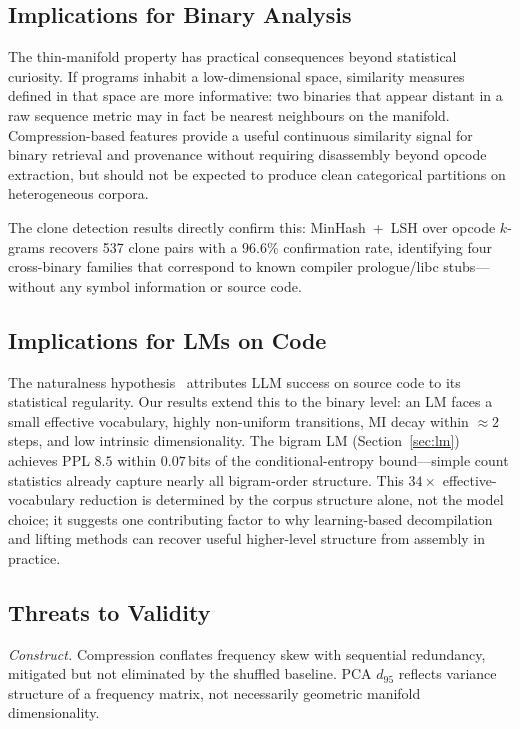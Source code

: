 \documentclass[conference]{IEEEtran}
\begin{document}
\subsection{Implications for Binary Analysis}

The thin-manifold property has practical consequences beyond statistical
curiosity.  If programs inhabit a low-dimensional space, similarity
measures defined in that space are more informative: two binaries that
appear distant in a raw sequence metric may in fact be nearest
neighbours on the manifold.  Compression-based features provide a useful
continuous similarity signal for binary retrieval and provenance without
requiring disassembly beyond opcode extraction, but should not be
expected to produce clean categorical partitions on heterogeneous
corpora.

The clone detection results directly confirm this:
MinHash~+~LSH over opcode $k$-grams recovers 537 clone pairs with a
$96.6\%$ confirmation rate, identifying four cross-binary families that
correspond to known compiler prologue/libc stubs---without any symbol
information or source code.

\subsection{Implications for LMs on Code}

The naturalness hypothesis~\cite{hindle2012naturalness} attributes LLM
success on source code to its statistical regularity.  Our results
extend this to the binary level: an LM faces a small effective
vocabulary, highly non-uniform transitions, MI decay within ${\approx}2$
steps, and low intrinsic dimensionality.  The bigram LM
(Section~\ref{sec:lm}) achieves PPL $8.5$ within $0.07$\,bits of the
conditional-entropy bound---simple count statistics already capture
nearly all bigram-order structure.  This $34{\times}$ effective-vocabulary
reduction is determined by the corpus structure alone, not the model
choice; it suggests one contributing factor to why learning-based
decompilation and lifting methods can recover useful higher-level
structure from assembly in practice.

\subsection{Threats to Validity}

\emph{Construct.}  Compression conflates frequency skew with sequential
redundancy, mitigated but not eliminated by the shuffled baseline.  PCA
$d_{95}$ reflects variance structure of a frequency matrix, not
necessarily geometric manifold dimensionality.
\end{document}
